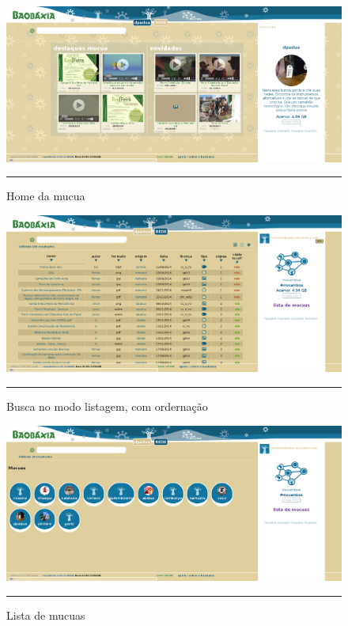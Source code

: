 \begin{figure}[htbp]
  \centering
  \includegraphics[width=\textwidth]{./Fig/InterfaceBaobaxia-home-mucua.pdf}
  \rule{35em}{0.5pt}
  \caption[Home da mucua]{Home da mucua}
  \label{fig:InterfaceBaobaxia-home-mucua}
\end{figure}

\begin{figure}[htbp]
  \centering
  \includegraphics[width=\textwidth]{./Fig/InterfaceBaobaxia-listagem-sort.pdf}
  \rule{35em}{0.5pt}
  \caption[Busca no modo listagem, com ordernação]{Busca no modo listagem, com ordernação}
  \label{fig:InterfaceBaobaxia-listagem-sort}
\end{figure}

\begin{figure}[htbp]
  \centering
  \includegraphics[width=\textwidth]{./Fig/InterfaceBaobaxia-lista-mucuas.pdf}
  \rule{35em}{0.5pt}
  \caption[Lista de mucuas]{Lista de mucuas}
  \label{fig:InterfaceBaobaxia-lista-mucuas}
\end{figure}

